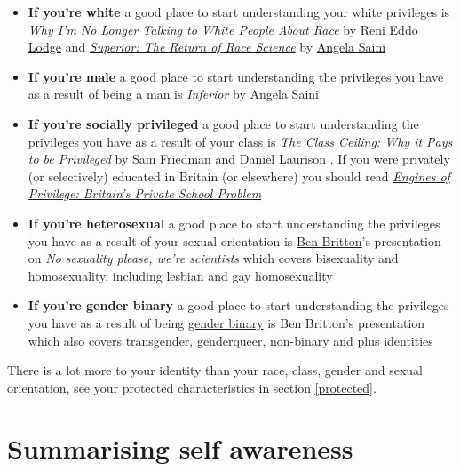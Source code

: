 \documentclass[
]{book}
\providecommand{\tightlist}{%
  \setlength{\itemsep}{0pt}\setlength{\parskip}{0pt}}
\begin{document}
\begin{itemize}
\tightlist
\item
  \textbf{If you're white} a good place to start understanding your white privileges is \emph{\href{https://en.wikipedia.org/wiki/Why_I'm_No_Longer_Talking_to_White_People_About_Race}{Why I'm No Longer Talking to White People About Race}} by \href{https://en.wikipedia.org/wiki/Reni_Eddo-Lodge}{Reni Eddo Lodge} \citep{nottalking} and \emph{\href{https://en.wikipedia.org/wiki/Superior:_The_Return_of_Race_Science}{Superior: The Return of Race Science}} by \href{https://en.wikipedia.org/wiki/Angela_Saini}{Angela Saini}
\item
  \textbf{If you're male} a good place to start understanding the privileges you have as a result of being a man is \emph{\href{https://en.wikipedia.org/wiki/Inferior_(book)}{Inferior}} by \href{https://en.wikipedia.org/wiki/Angela_Saini}{Angela Saini} \citep{inferior}
\item
  \textbf{If you're socially privileged} a good place to start understanding the privileges you have as a result of your class is \emph{The Class Ceiling: Why it Pays to be Privileged} by Sam Friedman and Daniel Laurison \citep{classceiling}. If you were privately (or selectively) educated in Britain (or elsewhere) you should read \emph{\href{https://en.wikipedia.org/wiki/Engines_of_Privilege}{Engines of Privilege: Britain's Private School Problem}} \citep{nicebutdim}
\item
  \textbf{If you're heterosexual} a good place to start understanding the privileges you have as a result of your sexual orientation is \href{https://en.wikipedia.org/wiki/Ben_Britton}{Ben Britton}'s presentation on \emph{No sexuality please, we're scientists} \citep{nosex} which covers bisexuality and homosexuality, including lesbian and gay homosexuality
\item
  \textbf{If you're gender binary} a good place to start understanding the privileges you have as a result of being \href{https://en.wikipedia.org/wiki/Gender_binary}{gender binary} is Ben Britton's presentation \citep{nosex} which also covers transgender, genderqueer, non-binary and plus identities
\end{itemize}

There is a lot more to your identity than your race, class, gender and sexual orientation, see your protected characteristics in section \ref{protected}.

\hypertarget{tldr2}{%
\section{Summarising self awareness}\label{tldr2}}
\end{document}

